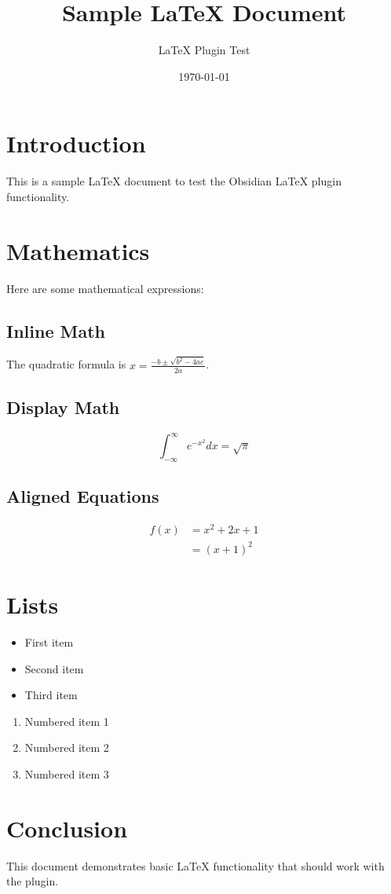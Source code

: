 \documentclass{article}
\title{Sample LaTeX Document}
\author{LaTeX Plugin Test}
\date{\today}
\begin{document}
\maketitle

\section{Introduction}

This is a sample LaTeX document to test the Obsidian LaTeX plugin functionality.

\section{Mathematics}

Here are some mathematical expressions:

\subsection{Inline Math}
The quadratic formula is $x = \frac{-b \pm \sqrt{b^2 - 4ac}}{2a}$.

\subsection{Display Math}
\begin{equation}
    \int_{-\infty}^{\infty} e^{-x^2} dx = \sqrt{\pi}
\end{equation}

\subsection{Aligned Equations}
\begin{align}
    f(x) &= x^2 + 2x + 1 \\
    &= (x + 1)^2
\end{align}

\section{Lists}

\begin{itemize}
    \item First item
    \item Second item
    \item Third item
\end{itemize}

\begin{enumerate}
    \item Numbered item 1
    \item Numbered item 2
    \item Numbered item 3
\end{enumerate}

\section{Conclusion}

This document demonstrates basic LaTeX functionality that should work with the plugin.
\end{document}
